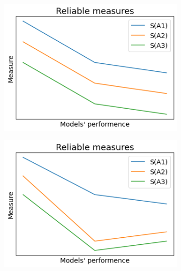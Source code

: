 \begin{figure}[h]
  \centering
 \begin{subfigure}{.3\textwidth}
    \centering
    \includegraphics[width=\textwidth]{experiments/desc/rel1.png}
    \caption{}\label{fig:rel-measure-1}
\end{subfigure}
 \begin{subfigure}{.3\textwidth}
    \centering
    \includegraphics[width=\textwidth]{experiments/desc/rel2.png}
    \caption{}\label{fig:rel-measure-2}
\end{subfigure}
 \begin{subfigure}{.3\textwidth}
    \centering

\end{subfigure}
\end{figure}
